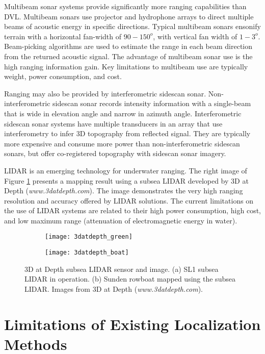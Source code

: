Multibeam sonar systems provide significantly more ranging capabilities than DVL.  
Multibeam sonars use projector and hydrophone arrays to direct multiple beams of acoustic energy in specific directions.
Typical multibeam sonars ensonify terrain with a horizontal fan-width of $90-150^{o}$, with vertical fan width of $1-3^{o}$.
Beam-picking algorithms are used to estimate the range in each beam direction from the returned acoustic signal.
The advantage of multibeam sonar use is the high ranging information gain.
Key limitations to multibeam use are typically weight, power consumption, and cost.

Ranging may also be provided by interferometric sidescan sonar.  
Non-interferometric sidescan sonar records intensity information with a single-beam that is wide in elevation angle and narrow in azimuth angle.
Interferometric sidescan sonar systems have multiple transducers in an array that use interferometry to infer 3D topography from reflected signal.
They are typically more expensive and consume more power than non-interferometric sidescan sonars, but offer co-registered topography with sidescan sonar imagery.

LIDAR is an emerging technology for underwater ranging.  
The right image of Figure \ref{fig:3datdepth} presents a mapping result using a subsea LIDAR developed by 3D at Depth (\emph{www.3datdepth.com}).
The image demonstrates the very high ranging resolution and accuracy offered by LIDAR solutions.
The current limitations on the use of LIDAR systems are related to their high power consumption, high cost, and low maximum range (attenuation of electromagnetic energy in water).

\begin{figure}[!h!]
	\centering
	\begin{subfigure}[b]{0.565\textwidth}
		\texttt{[image: 3datdepth\_green]}
		\caption{}
 	 \end{subfigure}
  	\centering
	\begin{subfigure}[b]{0.41\textwidth}
                \texttt{[image: 3datdepth\_boat]}
                \caption{}
  	\end{subfigure}
  	\caption{3D at Depth subsea LIDAR sensor and image. (a) SL1 subsea LIDAR in operation. (b) Sunden rowboat mapped using the subsea LIDAR. Images from 3D at Depth (\emph{www.3datdepth.com}). }
  	\label{fig:3datdepth}
\end{figure}

\section{Limitations of Existing Localization Methods}
\label{intro.Limitations}

